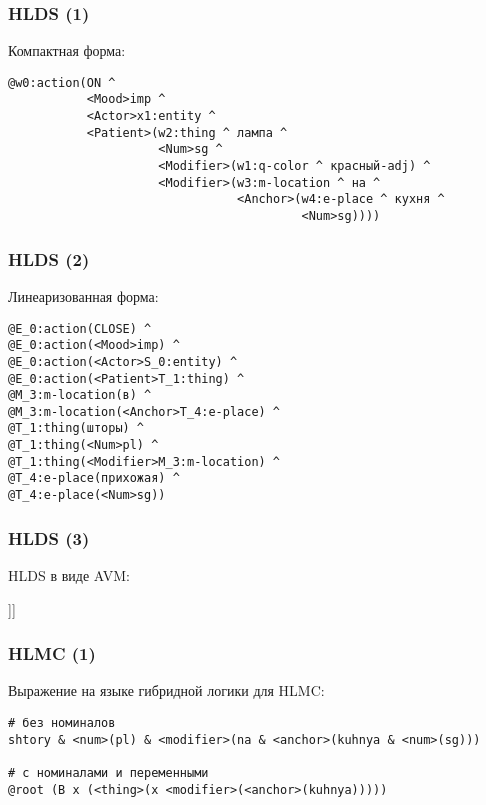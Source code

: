 \documentclass{beamer}
\begin{document}
\begin{frame}[fragile]
\frametitle{HLDS (1)}
Компактная форма:
{\footnotesize \begin{verbatim}
@w0:action(ON ^
           <Mood>imp ^
           <Actor>x1:entity ^
           <Patient>(w2:thing ^ лампа ^
                     <Num>sg ^
                     <Modifier>(w1:q-color ^ красный-adj) ^
                     <Modifier>(w3:m-location ^ на ^
                                <Anchor>(w4:e-place ^ кухня ^
                                         <Num>sg))))
\end{verbatim}}
\end{frame}

\begin{frame}[fragile]
\frametitle{HLDS (2)}
Линеаризованная форма:
{\footnotesize \begin{verbatim}
@E_0:action(CLOSE) ^ 
@E_0:action(<Mood>imp) ^
@E_0:action(<Actor>S_0:entity) ^ 
@E_0:action(<Patient>T_1:thing) ^ 
@M_3:m-location(в) ^ 
@M_3:m-location(<Anchor>T_4:e-place) ^ 
@T_1:thing(шторы) ^ 
@T_1:thing(<Num>pl) ^ 
@T_1:thing(<Modifier>M_3:m-location) ^ 
@T_4:e-place(прихожая) ^ 
@T_4:e-place(<Num>sg))
\end{verbatim}}
\end{frame}

\begin{frame}[fragile]
\frametitle{HLDS (3)}
HLDS в виде AVM:\\
\begin{center}
	\begin{avm}
	[{action} predicate & on \cr
    	      Mood & imp \cr 
        	  Actor & @{1} \cr 
	          Patient & [{thing} predicate & @{2} лампа \cr
    	                         Num & sg \cr 
        	                     Modifier & [{q-color} predicate & красный\_adj ]]]
	\end{avm}
\end{center}	
\end{frame}

\begin{frame}[fragile]
\frametitle{HLMC (1)}
Выражение на языке гибридной логики для HLMC:
{\footnotesize \begin{verbatim}
# без номиналов
shtory & <num>(pl) & <modifier>(na & <anchor>(kuhnya & <num>(sg)))

# с номиналами и переменными
@root (B x (<thing>(x <modifier>(<anchor>(kuhnya)))))
\end{verbatim}}
\end{frame}
\end{document}
